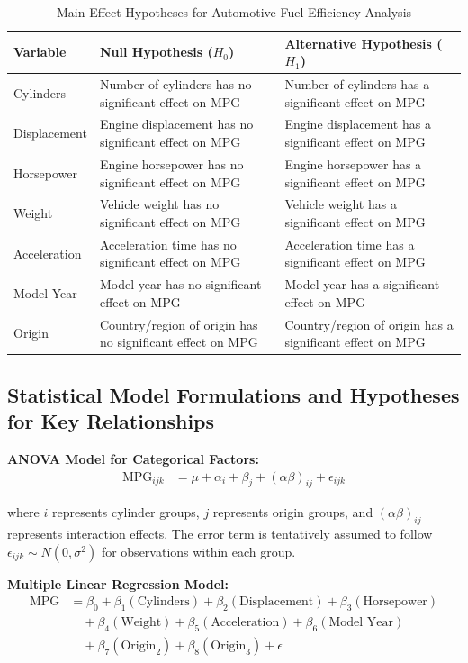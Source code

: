 \documentclass[12pt]{article}
\begin{document}
\begin{table}[h]
\centering
\caption{Main Effect Hypotheses for Automotive Fuel Efficiency Analysis}
\label{tab:main_hypotheses}
\begin{tabular}{p{2.5cm}p{6cm}p{6cm}}
\toprule
\textbf{Variable} & \textbf{Null Hypothesis ($H_0$)} & \textbf{Alternative Hypothesis ($H_1$)} \\
\midrule
Cylinders & Number of cylinders has no significant effect on MPG & Number of cylinders has a significant effect on MPG \\
\midrule
Displacement & Engine displacement has no significant effect on MPG & Engine displacement has a significant effect on MPG \\
\midrule
Horsepower & Engine horsepower has no significant effect on MPG & Engine horsepower has a significant effect on MPG \\
\midrule
Weight & Vehicle weight has no significant effect on MPG & Vehicle weight has a significant effect on MPG \\
\midrule
Acceleration & Acceleration time has no significant effect on MPG & Acceleration time has a significant effect on MPG \\
\midrule
Model Year & Model year has no significant effect on MPG & Model year has a significant effect on MPG \\
\midrule
Origin & Country/region of origin has no significant effect on MPG & Country/region of origin has a significant effect on MPG \\
\bottomrule
\end{tabular}
\end{table}

\subsection{Statistical Model Formulations and Hypotheses for Key Relationships}

\textbf{ANOVA Model for Categorical Factors:}
\begin{align}
\text{MPG}_{ijk} &= \mu + \alpha_i + \beta_j + (\alpha\beta)_{ij} + \epsilon_{ijk}
\end{align}

\noindent where $i$ represents cylinder groups, $j$ represents origin groups, and $(\alpha\beta)_{ij}$ represents interaction effects.
The error term is tentatively assumed to follow \(\epsilon_{ijk} \sim N(0,\sigma^2)\) for observations within each group.

\textbf{Multiple Linear Regression Model:}
\begin{align}
\text{MPG} &= \beta_0 + \beta_1(\text{Cylinders}) + \beta_2(\text{Displacement}) + \beta_3(\text{Horsepower}) \nonumber \\
&\quad + \beta_4(\text{Weight}) + \beta_5(\text{Acceleration}) + \beta_6(\text{Model Year}) \nonumber \\
&\quad + \beta_7(\text{Origin}_2) + \beta_8(\text{Origin}_3) + \epsilon
\end{align}
\end{document}
